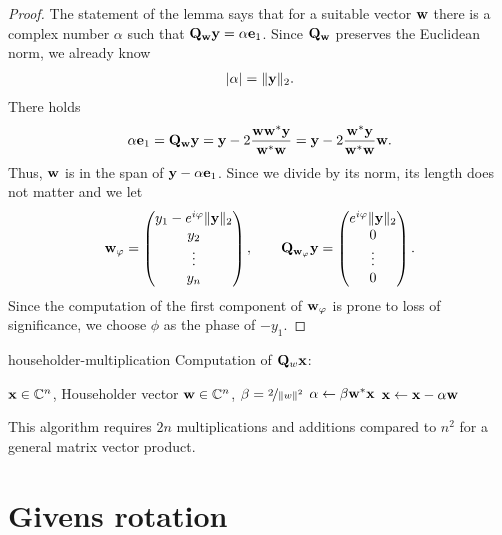 \begin{proof}
  The statement of the lemma says that for a suitable vector $\mathbf w$ there is a complex number
  $\alpha$ such that $\mathbf Q_{\mathbf w} \mathbf y = \alpha \mathbf e_1$. Since
  $\mathbf Q_{\mathbf w}$ preserves the Euclidean norm, we already know
  \begin{gather}
    \lvert\alpha\rvert = \lVert\mathbf y\rVert_2.
  \end{gather}
  There holds
  \begin{gather}
    \alpha\mathbf e_1 = \mathbf Q_{\mathbf w} \mathbf y
    = \mathbf y - 2 \frac{\mathbf w\mathbf w^*\mathbf y}{\mathbf w^*\mathbf w}
    = \mathbf y - 2 \frac{\mathbf w^*\mathbf y}{\mathbf w^*\mathbf w}\mathbf w.
  \end{gather}
  Thus, $\mathbf w$ is in the span of $\mathbf y-\alpha \mathbf e_1$. Since we divide by
  its norm, its length does not matter and we let
  \begin{gather}
    \mathbf w_\varphi =
    \begin{pmatrix}
      y_1 - e^{i\varphi} \lVert\mathbf y\rVert_2\\y_2\\\vdots\\y_n
    \end{pmatrix},
    \qquad
    \mathbf Q_{\mathbf w_\varphi}\mathbf y =
    \begin{pmatrix}
      e^{i\varphi} \lVert\mathbf y\rVert_2\\0\\\vdots\\0
    \end{pmatrix}.
  \end{gather}
  Since the computation of the first component of $\mathbf w_\varphi$ is prone to loss of significance, we choose $\phi$ as the phase of $-y_1$.
\end{proof}

\begin{Algorithm}{householder-multiplication}
  Computation of $\mathbf Q_w\mathbf x$:
  \begin{algorithmic}[1]
    \Require $\mathbf x\in\mathbb C^n$, Householder vector $\mathbf w\in \mathbb C^n$, $\beta = \nicefrac2{\lVert w\rVert^2}$
    \State $\alpha \gets \beta \mathbf w^*\mathbf x$
    \State $\mathbf x \gets \mathbf x - \alpha \mathbf w$
  \end{algorithmic}
  This algorithm requires $2n$ multiplications and additions compared
  to $n^2$ for a general matrix vector product.
\end{Algorithm}

\section{Givens rotation}

